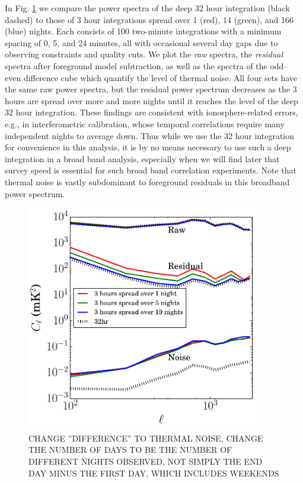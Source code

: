 \documentclass[preprint]{aastex}
\begin{document}
In Fig. \ref{fig:respspecspacingsstudy} we compare the power spectra of the deep 32 hour integration (black dashed) to those of 3 hour integrations spread over 1 (red), 14 (green), and 166 (blue) nights. Each consists of 100 two-minute integrations with a minimum spacing of 0, 5, and 24 minutes, all with occasional several day gaps due to observing constraints and quality cuts. We plot the \textit{raw} spectra, the \textit{residual} spectra after foreground model subtraction, as well as the spectra of the odd--even difference cube which quantify the level of thermal noise. All four sets have the same raw power spectra, but the residual power spectrum decreases as the 3 hours are spread over more and more nights until it reaches the level of the deep 32 hour integration. These findings are consistent with ionosphere-related errors, e.g., in interferometric calibration, whose temporal correlations require many independent nights to average down. Thus while we use the 32 hour integration for convenience in this analysis, it is by no means necessary to use such a deep integration in a broad band analysis, especially when we will find later that survey speed is essential for such broad band correlation experiments. Note that thermal noise is vastly subdominant to foreground residuals in this broadband power spectrum.

\begin{figure}[h]
\centering
\includegraphics[width=4in]{images/res_pspec_of_100_obsids_with_diff_spacings.pdf}
\caption{CHANGE  ''DIFFERENCE'' TO THERMAL NOISE, CHANGE THE NUMBER OF DAYS TO BE THE NUMBER OF DIFFERENT NIGHTS OBSERVED, NOT SIMPLY THE END DAY MINUS THE FIRST DAY, WHICH INCLUDES WEEKENDS}
\label{fig:respspecspacingsstudy}
\end{figure}
\end{document}
